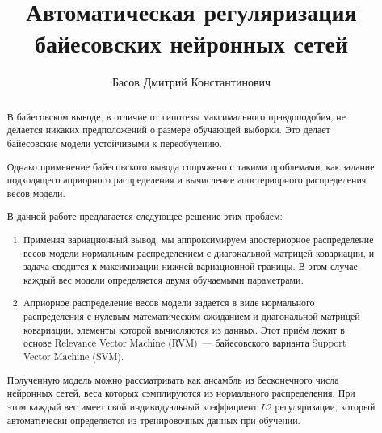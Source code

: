 \documentclass{article}
\title{Автоматическая регуляризация байесовских нейронных сетей}
\author{
    Басов Дмитрий Константинович
}
\date{}
\numberwithin{equation}{section}
\begin{document}
    \maketitle

    \begin{abstract}
        В байесовском выводе, в отличие от гипотезы максимального правдоподобия,
        не делается никаких предположений о размере обучающей выборки.
        Это делает байесовские модели устойчивыми к переобучению.

        Однако применение байесовского вывода сопряжено с такими проблемами,
        как задание подходящего априорного распределения и вычисление апостериорного распределения весов модели.

        В данной работе предлагается следующее решение этих проблем:
        \begin{enumerate}
            \item Применяя вариационный вывод,
                мы аппроксимируем апостериорное распределение весов модели
                нормальным распределением с диагональной матрицей ковариации,
                и задача сводится к максимизации нижней вариационной границы.
                В этом случае каждый вес модели определяется двумя обучаемыми параметрами.
            \item Априорное распределение весов модели задается в виде
                нормального распределения с нулевым математическим ожиданием
                и диагональной матрицей ковариации, элементы которой вычисляются из данных.
                Этот приём лежит в основе Relevance Vector Machine (RVM)~--- байесовского варианта Support Vector Machine (SVM).
        \end{enumerate}

        Полученную модель можно рассматривать как
        ансамбль из бесконечного числа нейронных сетей,
        веса которых сэмплируются из нормального распределения.
        При этом каждый вес имеет свой индивидуальный коэффициент $L2$ регуляризации,
        который автоматически определяется из тренировочных данных при обучении.

    \end{abstract}
\end{document}

